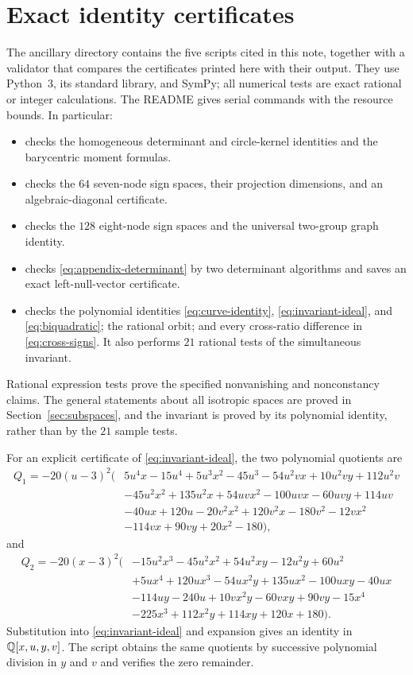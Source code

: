 \section{Exact identity certificates}\label{sec:certificates}

The ancillary directory contains the five scripts cited in this note,
together with a validator that compares the certificates printed here
with their output. They use
Python~3, its standard library, and SymPy; all numerical tests are
exact rational or integer calculations. The README gives serial
commands with the resource bounds. In particular:
\begin{itemize}
\item {} checks the homogeneous determinant
and circle-kernel identities and the barycentric moment formulas.
\item {} checks the $64$ seven-node sign spaces,
their projection dimensions, and an algebraic-diagonal certificate.
\item {} checks the $128$ eight-node sign
spaces and the universal two-group graph identity.
\item {} checks
\eqref{eq:appendix-determinant} by two determinant algorithms and
saves an exact left-null-vector certificate.
\item {} checks the polynomial identities
\eqref{eq:curve-identity}, \eqref{eq:invariant-ideal}, and
\eqref{eq:biquadratic}; the rational orbit; and every cross-ratio
difference in \eqref{eq:cross-signs}. It also performs $21$ rational
tests of the simultaneous invariant.
\end{itemize}
Rational expression tests prove the specified nonvanishing and
nonconstancy claims. The general statements about all isotropic
spaces are proved in Section~\ref{sec:subspaces}, and the invariant
is proved by its polynomial identity, rather than by the $21$
sample tests.

\begingroup
{}
For an explicit certificate of \eqref{eq:invariant-ideal}, the
two polynomial quotients are
\begin{align*}
Q_1=-20(u-3)^2\bigl(&5u^4x-15u^4+5u^3x^2-45u^3
 -54u^2vx+10u^2vy+112u^2v\\
&-45u^2x^2+135u^2x+54uvx^2-100uvx-60uvy
 +114uv\\
&-40ux+120u-20v^2x^2+120v^2x-180v^2
 -12vx^2\\
&-114vx+90vy+20x^2-180\bigr),
\end{align*}
and
\begin{align*}
Q_2=-20(x-3)^2\bigl(&-15u^2x^3-45u^2x^2+54u^2xy
 -12u^2y+60u^2\\
&+5ux^4+120ux^3-54ux^2y+135ux^2
 -100uxy-40ux\\
&-114uy-240u+10vx^2y-60vxy+90vy
 -15x^4\\
&-225x^3+112x^2y+114xy+120x+180\bigr).
\end{align*}
\endgroup
Substitution into \eqref{eq:invariant-ideal} and expansion gives
an identity in $\mathbb Q[x,u,y,v]$. The script obtains the same quotients
by successive polynomial division in $y$ and $v$ and verifies the
zero remainder.
